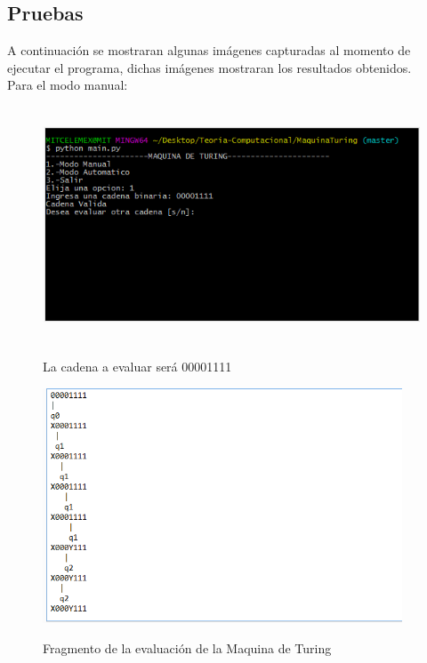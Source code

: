\subsection{Pruebas}
A continuaci\'on se mostraran algunas im\'agenes capturadas al momento de ejecutar el programa, dichas im\'agenes mostraran los resultados obtenidos.\\
\vspace{1.0cm}
Para el modo manual:\\
\begin{figure}[H]
\includegraphics[width=\textwidth, height=7cm]{ModoManualTuring.png}
\label{fig:manual_webay}
\caption{La cadena a evaluar ser\'a 00001111}
\end{figure}

\begin{figure}[H]
\includegraphics[width=\textwidth, height=7cm]{ArchivoTuring.png}
\label{fig:manualtexto_alfabeto}
\caption{Fragmento de la evaluaci\'on de la Maquina de Turing}
\end{figure}

